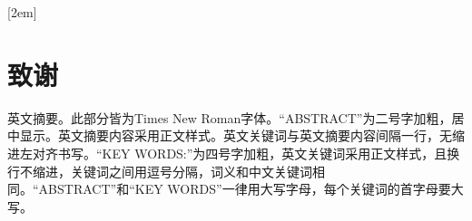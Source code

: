 
[2em]{\vspace{.25\baselineskip}\sihao\song}
             {\thecontentslabel\qquad}{} 
             {\titlerule*[5pt]{$\cdot$}\sihao\contentspage}     

\chapter*{致\qquad 谢}

英文摘要。此部分皆为Times New Roman字体。“ABSTRACT”为二号字加粗，居中显示。英文摘要内容采用正文样式。英文关键词与英文摘要内容间隔一行，无缩进左对齐书写。“KEY WORDS:”为四号字加粗，英文关键词采用正文样式，且换行不缩进，关键词之间用逗号分隔，词义和中文关键词相同。“ABSTRACT”和“KEY WORDS”一律用大写字母，每个关键词的首字母要大写。